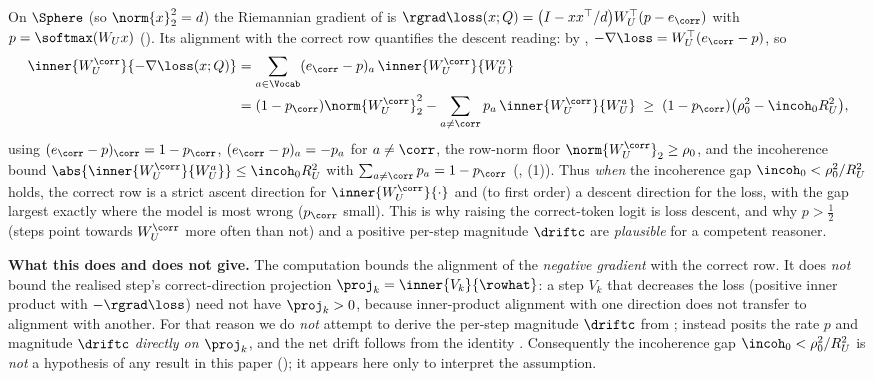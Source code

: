 \begin{remark}
\label{rem:descent_naming}
On $\Sphere$ (so $\norm{x}_2^2=d$) the Riemannian gradient of
 is
$\rgrad\loss(x;Q)=\bigl(I-xx^\top/d\bigr)W_U^\top(p-e_{\corr})$ with
$p=\softmax(W_U x)$ (). Its alignment with the
correct row quantifies the descent reading: by
, $-\nabla\loss=W_U^\top(e_{\corr}-p)$, so
\begin{align}\label{eq:gradient_alignment}
   \inner{W_U^{\corr}}{-\nabla\loss(x;Q)}
   &= \sum_{a\in\Vocab}(e_{\corr}-p)_a\,\inner{W_U^{\corr}}{W_U^a}
   \nonumber\\
   &= (1-p_{\corr})\norm{W_U^{\corr}}_2^2
      - \sum_{a\neq\corr} p_a\,\inner{W_U^{\corr}}{W_U^a}
   \;\ge\; (1-p_{\corr})\bigl(\rho_0^2 - \incoh_0 R_U^2\bigr),
\end{align}
using $(e_{\corr}-p)_{\corr}=1-p_{\corr}$, $(e_{\corr}-p)_a=-p_a$ for
$a\neq\corr$, the row-norm floor $\norm{W_U^{\corr}}_2\ge\rho_0$, and the
incoherence bound
$\abs{\inner{W_U^{\corr}}{W_U^a}}\le\incoh_0 R_U^2$ with
$\sum_{a\neq\corr}p_a=1-p_{\corr}$ (,
(1)). Thus \emph{when} the incoherence gap
$\incoh_0<\rho_0^2/R_U^2$ holds, the correct row is a strict ascent
direction for $\inner{W_U^{\corr}}{\cdot}$ and (to first order) a descent
direction for the loss, with the gap largest exactly where the model is
most wrong ($p_{\corr}$ small). This is why raising the correct-token logit
is loss descent, and why $p>\tfrac12$ (steps point towards $W_U^{\corr}$
more often than not) and a positive per-step magnitude $\driftc$ are
\emph{plausible} for a competent reasoner.

\smallskip\noindent\textbf{What this does and does not give.} The
computation  bounds the alignment of the
\emph{negative gradient} with the correct row. It does \emph{not} bound the
realised step's correct-direction projection $\proj_k=\inner{V_k}{\rowhat}$:
a step $V_k$ that decreases the loss (positive inner product with
$-\rgrad\loss$) need not have $\proj_k>0$, because inner-product alignment
with one direction does not transfer to alignment with another. For that
reason we do \emph{not} attempt to derive the per-step magnitude $\driftc$
from ; instead  posits the
rate $p$ and magnitude $\driftc$ \emph{directly on $\proj_k$}, and the net
drift follows from the identity . Consequently the
incoherence gap $\incoh_0<\rho_0^2/R_U^2$ is \emph{not} a hypothesis of any
result in this paper (); it appears here
only to interpret the assumption.
\end{remark}
